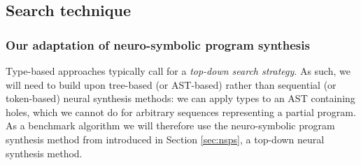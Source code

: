 \documentclass{article} %
\begin{document}
\subsection{Search technique}

\subsubsection{Our adaptation of neuro-symbolic program synthesis} \label{sec:ournsps}

Type-based approaches typically call for a \emph{top-down search strategy}.
As such, we will need to build upon tree-based (or AST-based) rather than sequential (or token-based) neural synthesis methods:
we can apply types to an AST containing holes,
which we cannot do for arbitrary sequences representing a partial program.
%
As a benchmark algorithm we will therefore use the neuro-symbolic program synthesis
method from \citet{nsps} introduced in Section \ref{sec:nsps},
a top-down neural synthesis method.







\end{document}

